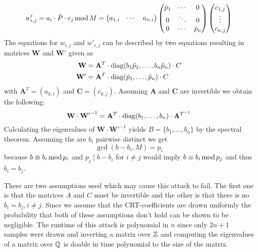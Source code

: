 \documentclass[english]{scrartcl}
\theoremstyle{plain}
\theoremstyle{definition}
\begin{document}
    \begin{equation*}
        w'_{i,j} = a_i \cdot \hat{P} \cdot c_j \operatorname{mod} M =
        \begin{pmatrix}
            a_{1, i} & \cdots & a_{n, i}
        \end{pmatrix}
        \begin{pmatrix}
            \hat{p}_1 & \cdots & 0 \\
            0 & \ddots & 0 \\
            0 & \cdots & \hat{p}_n
        \end{pmatrix}
        \begin{pmatrix}
            c_{1, j} \\
            \vdots \\
            c_{n, j}
        \end{pmatrix}
    \end{equation*}
    The equations for $w_{i,j}$ and $w'_{i,j}$ can be described by two equations resulting in matrices $\mathbf{W}$ and $\mathbf{W'}$ given as
    \begin{align*}
        \mathbf{W} &= \mathbf{A}^T \cdot \operatorname{diag}(b_1 \hat{p}_1, \dots, b_n \hat{p}_n) \cdot C \\
        \mathbf{W'} &= \mathbf{A}^T \cdot \operatorname{diag}(\hat{p}_1, \dots, \hat{p}_n) \cdot C
    \end{align*}
    with $\mathbf{A}^T = (a_{k,i})$ and $\mathbf{C} = (c_{k,j})$.
    Assuming $\mathbf{A}$ and $\mathbf{C}$ are invertible we obtain the following:
    \begin{equation*}
        \mathbf{W} \cdot \mathbf{W'}^{-1} = \mathbf{A}^T \cdot \operatorname{diag}(b_1, \dots, b_n) \cdot \mathbf{A}^{T^{-1}}
    \end{equation*}
    Calculating the eigenvalues of $\mathbf{W} \cdot \mathbf{W'}^{-1}$ yields $B = \{b_1, \dots, b_n\}$ by the spectral theorem.
    Assuming the are $b_i$ pairwise distinct we get
    \begin{equation*}
        \gcd(b - b_i, M) = p_i
    \end{equation*}
    because $b \equiv b_i \operatorname{mod}{p_i}$ and $p_j \mid b - b_i $ for $i \neq j$ would imply $b \equiv b_i \operatorname{mod}{p_j}$ and thus $b_i = b_j$.

    There are two assumptions used which may cause this attack to fail. The first one is that the matrices $A$ and $C$ must be invertible and the other is that there is no $b_i = b_j, i \neq j$. Since we assume that the CRT-coefficients are drawn uniformly the probability that both of these assumptions don't hold can be shown to be negligible.
    The runtime of this attack is polynomial in $n$ since only $2n+1$ samples were drawn and inverting a matrix over $\mathbb{Z}$ and computing the eigenvalues of a matrix over $\mathbb{Q}$ is doable in time polynomial to the size of the matrix.
\end{document}
